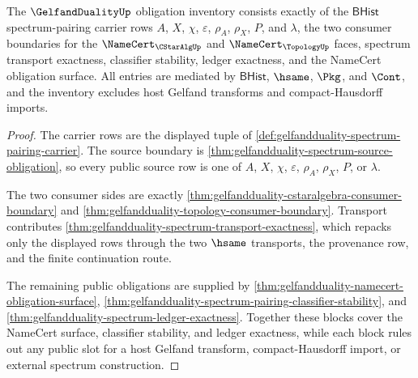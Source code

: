 \begin{theorem}
\label{thm:gelfandduality-obligation-closure-inventory}
The $\GelfandDualityUp$ obligation inventory consists exactly of the
$\mathsf{BHist}$ spectrum-pairing carrier rows
$A$, $X$, $\chi$, $\varepsilon$, $\rho_{A}$, $\rho_{X}$, $P$, and $\lambda$,
the two consumer boundaries for the $\NameCert_{\CStarAlgUp}$ and
$\NameCert_{\TopologyUp}$ faces, spectrum transport exactness, classifier
stability, ledger exactness, and the NameCert obligation surface. All entries
are mediated by $\mathsf{BHist}$, $\hsame$, $\Pkg$, and $\Cont$, and the
inventory excludes host Gelfand transforms and compact-Hausdorff imports.
\end{theorem}
\begin{proof}
The carrier rows are the displayed tuple of
\autoref{def:gelfandduality-spectrum-pairing-carrier}. The source boundary is
\autoref{thm:gelfandduality-spectrum-source-obligation}, so every public source
row is one of $A$, $X$, $\chi$, $\varepsilon$, $\rho_{A}$, $\rho_{X}$, $P$, or
$\lambda$.

The two consumer sides are exactly
\autoref{thm:gelfandduality-cstaralgebra-consumer-boundary} and
\autoref{thm:gelfandduality-topology-consumer-boundary}. Transport contributes
\autoref{thm:gelfandduality-spectrum-transport-exactness}, which repacks only
the displayed rows through the two $\hsame$ transports, the provenance row, and
the finite continuation route.

The remaining public obligations are supplied by
\autoref{thm:gelfandduality-namecert-obligation-surface},
\autoref{thm:gelfandduality-spectrum-pairing-classifier-stability}, and
\autoref{thm:gelfandduality-spectrum-ledger-exactness}. Together these blocks
cover the NameCert surface, classifier stability, and ledger exactness, while
each block rules out any public slot for a host Gelfand transform,
compact-Hausdorff import, or external spectrum construction.
\end{proof}

